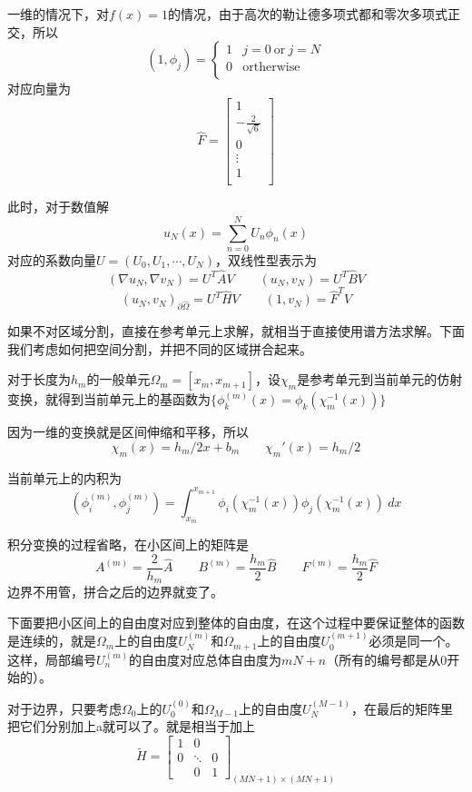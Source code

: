 \documentclass[UTF8,12pt]{article}
\begin{document}
一维的情况下，对$f(x) = 1$的情况，由于高次的勒让德多项式都和零次多项式正交，所以
\begin{equation}
(1, \phi_j) = \left\{ \begin{array}{ll}
1 & j = 0 \ \text{or} \ j = N\\
0 & \text{ortherwise} \\
\end{array}  \right.
\end{equation}
对应向量为
\begin{equation}
\hat{F} = \left[ \begin{array}{c}
1 \\
-\frac{2}{\sqrt{6}} \\
0 \\
\vdots \\
1 \\
\end{array} \right]
\end{equation}

此时，对于数值解
$$ u_N(x) = \sum_{n = 0}^{N} U_{n} \phi_n(x) $$
对应的系数向量$U = (U_0, U_1, \cdots, U_N)$，双线性型表示为
$$ (\nabla u_N, \nabla v_N) = U^T \hat{A} V \qquad (u_N, v_N) = U^T \hat{B} V $$
$$ (u_N, v_N)_{\partial\hat{\Omega}} = U^T \hat{H} V \qquad  (1, v_N) = \hat{F}^T V $$

如果不对区域分割，直接在参考单元上求解，就相当于直接使用谱方法求解。下面我们考虑如何把空间分割，并把不同的区域拼合起来。

对于长度为$h_m$的一般单元$\Omega_m = [x_m, x_{m+1}]$，设$\chi_m$是参考单元到当前单元的仿射变换，就得到当前单元上的基函数为$\{\phi^{(m)}_k(x) = \phi_{k}(\chi_m^{-1}(x))\}$

因为一维的变换就是区间伸缩和平移，所以
$$ \chi_m(x) = h_m/2 x + b_m \qquad \chi_m'(x) = h_m/2 $$

当前单元上的内积为
$$ (\phi^{(m)}_i, \phi^{(m)}_j) = \int_{x_m}^{x_{m+1}} \phi_{i}(\chi_m^{-1}(x)) \phi_{j}(\chi_m^{-1}(x)) \ dx $$

积分变换的过程省略，在小区间上的矩阵是
$$ A^{(m)} = \frac{2}{h_m} \hat{A} \qquad B^{(m)} = \frac{h_m}{2} \hat{B} \qquad F^{(m)} = \frac{h_m}{2} \hat{F} $$
边界不用管，拼合之后的边界就变了。

下面要把小区间上的自由度对应到整体的自由度，在这个过程中要保证整体的函数是连续的，就是$\Omega_m$上的自由度$U^{(m)}_N$和$\Omega_{m+1}$上的自由度$U^{(m+1)}_0$必须是同一个。这样，局部编号$U^{(m)}_n$的自由度对应总体自由度为$m N + n$（所有的编号都是从0开始的）。

对于边界，只要考虑$\Omega_0$上的$U^{(0)}_0$和$\Omega_{M-1}$上的自由度$U^{(M-1)}_N$，在最后的矩阵里把它们分别加上a就可以了。就是相当于加上
\begin{equation}
\tilde{H} = \left[ \begin{array}{ccc}
1 & 0 &  \\ 
0 & \ddots & 0 \\ 
& 0 & 1
\end{array} \right]_{(MN+1) \times (MN+1)}
\end{equation}
\end{document}
